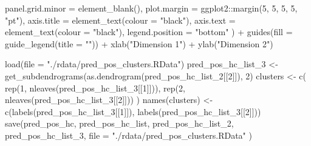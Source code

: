 \documentclass[
  11pt,
  oneside]{book}
\newenvironment{Shaded}{\begin{snugshade}}{\end{snugshade}}
\newcommand{\AttributeTok}[1]{\textcolor[rgb]{0.77,0.63,0.00}{#1}}
\newcommand{\DecValTok}[1]{\textcolor[rgb]{0.00,0.00,0.81}{#1}}
\newcommand{\FunctionTok}[1]{\textcolor[rgb]{0.00,0.00,0.00}{#1}}
\newcommand{\NormalTok}[1]{#1}
\newcommand{\OtherTok}[1]{\textcolor[rgb]{0.56,0.35,0.01}{#1}}
\newcommand{\SpecialCharTok}[1]{\textcolor[rgb]{0.00,0.00,0.00}{#1}}
\newcommand{\StringTok}[1]{\textcolor[rgb]{0.31,0.60,0.02}{#1}}
\begin{document}
\begin{Shaded}
\begin{Highlighting}[]
    \AttributeTok{panel.grid.minor =} \FunctionTok{element\_blank}\NormalTok{(),}
    \AttributeTok{plot.margin =}\NormalTok{ ggplot2}\SpecialCharTok{::}\FunctionTok{margin}\NormalTok{(}\DecValTok{5}\NormalTok{, }\DecValTok{5}\NormalTok{, }\DecValTok{5}\NormalTok{, }\DecValTok{5}\NormalTok{, }\StringTok{"pt"}\NormalTok{),}
    \AttributeTok{axis.title =} \FunctionTok{element\_text}\NormalTok{(}\AttributeTok{colour =} \StringTok{"black"}\NormalTok{),}
    \AttributeTok{axis.text =} \FunctionTok{element\_text}\NormalTok{(}\AttributeTok{colour =} \StringTok{"black"}\NormalTok{),}
    \AttributeTok{legend.position =} \StringTok{"bottom"}
\NormalTok{  ) }\SpecialCharTok{+}
  \FunctionTok{guides}\NormalTok{(}\AttributeTok{fill =} \FunctionTok{guide\_legend}\NormalTok{(}\AttributeTok{title =} \StringTok{""}\NormalTok{)) }\SpecialCharTok{+}
  \FunctionTok{xlab}\NormalTok{(}\StringTok{"Dimension 1"}\NormalTok{) }\SpecialCharTok{+}
  \FunctionTok{ylab}\NormalTok{(}\StringTok{"Dimension 2"}\NormalTok{)}
\end{Highlighting}
\end{Shaded}

\begin{Shaded}
\begin{Highlighting}[]
\FunctionTok{load}\NormalTok{(}\AttributeTok{file =} \StringTok{"./rdata/pred\_pos\_clusters.RData"}\NormalTok{)}
\NormalTok{pred\_pos\_hc\_list\_3 }\OtherTok{\textless{}{-}} \FunctionTok{get\_subdendrograms}\NormalTok{(}\FunctionTok{as.dendrogram}\NormalTok{(pred\_pos\_hc\_list\_2[[}\DecValTok{2}\NormalTok{]]), }\DecValTok{2}\NormalTok{)}
\NormalTok{clusters }\OtherTok{\textless{}{-}} \FunctionTok{c}\NormalTok{(}
  \FunctionTok{rep}\NormalTok{(}\DecValTok{1}\NormalTok{, }\FunctionTok{nleaves}\NormalTok{(pred\_pos\_hc\_list\_3[[}\DecValTok{1}\NormalTok{]])),}
  \FunctionTok{rep}\NormalTok{(}\DecValTok{2}\NormalTok{, }\FunctionTok{nleaves}\NormalTok{(pred\_pos\_hc\_list\_3[[}\DecValTok{2}\NormalTok{]]))}
\NormalTok{)}
\FunctionTok{names}\NormalTok{(clusters) }\OtherTok{\textless{}{-}} \FunctionTok{c}\NormalTok{(}\FunctionTok{labels}\NormalTok{(pred\_pos\_hc\_list\_3[[}\DecValTok{1}\NormalTok{]]), }\FunctionTok{labels}\NormalTok{(pred\_pos\_hc\_list\_3[[}\DecValTok{2}\NormalTok{]]))}
\FunctionTok{save}\NormalTok{(pred\_pos\_hc, pred\_pos\_hc\_list, pred\_pos\_hc\_list\_2, pred\_pos\_hc\_list\_3,}
  \AttributeTok{file =} \StringTok{"./rdata/pred\_pos\_clusters.RData"}
\NormalTok{)}
\end{Highlighting}
\end{Shaded}
\end{document}

